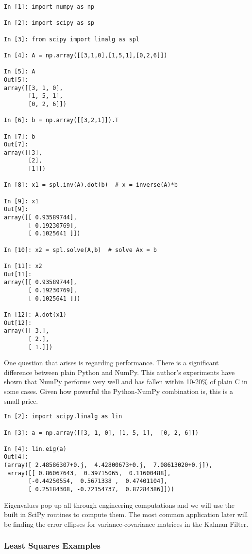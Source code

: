 \begin{verbatim}
In [1]: import numpy as np

In [2]: import scipy as sp

In [3]: from scipy import linalg as spl

In [4]: A = np.array([[3,1,0],[1,5,1],[0,2,6]])

In [5]: A
Out[5]:
array([[3, 1, 0],
       [1, 5, 1],
       [0, 2, 6]])

In [6]: b = np.array([[3,2,1]]).T

In [7]: b
Out[7]:
array([[3],
       [2],
       [1]])

In [8]: x1 = spl.inv(A).dot(b)  # x = inverse(A)*b

In [9]: x1
Out[9]:
array([[ 0.93589744],
       [ 0.19230769],
       [ 0.1025641 ]])

In [10]: x2 = spl.solve(A,b)  # solve Ax = b

In [11]: x2
Out[11]:
array([[ 0.93589744],
       [ 0.19230769],
       [ 0.1025641 ]])

In [12]: A.dot(x1)
Out[12]:
array([[ 3.],
       [ 2.],
       [ 1.]])
\end{verbatim}

One question that arises is regarding performance. There is a
significant difference between plain Python and NumPy. This author's
experiments have shown that NumPy performs very well and has fallen
within 10-20\% of plain C in some cases. Given how powerful the
Python-NumPy combination is, this is a small price.

\begin{verbatim}
In [2]: import scipy.linalg as lin

In [3]: a = np.array([[3, 1, 0], [1, 5, 1],  [0, 2, 6]])

In [4]: lin.eig(a)
Out[4]:
(array([ 2.48586307+0.j,  4.42800673+0.j,  7.08613020+0.j]),
 array([[ 0.86067643,  0.39715065,  0.11600488],
       [-0.44250554,  0.5671338 ,  0.47401104],
       [ 0.25184308, -0.72154737,  0.87284386]]))
\end{verbatim}

Eigenvalues pop up all through engineering computations and we will use
the built in SciPy routines to compute them. The most common application
later will be finding the error ellipses for variance-covariance
matrices in the Kalman Filter.

\hypertarget{least-squares-examples}{%
\subsubsection{Least Squares Examples}\label{least-squares-examples}}

